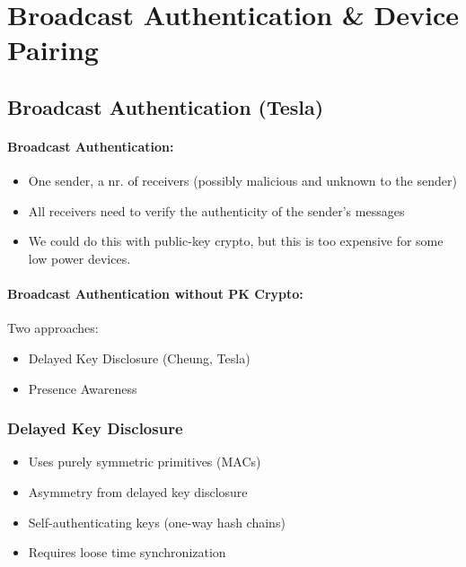 \section{Broadcast Authentication & Device Pairing}

\subsection{Broadcast Authentication (Tesla)}

\paragraph{Broadcast Authentication:} 
\begin{itemize}
    \item One sender, a nr. of receivers (possibly malicious and unknown to the sender)
    \item All receivers need to verify the authenticity of the sender's messages
    \item We could do this with public-key crypto, but this is too expensive for some low power devices. 
\end{itemize}

\paragraph{Broadcast Authentication without PK Crypto:} Two approaches:
\begin{itemize}
    \item Delayed Key Disclosure (Cheung, Tesla)
    \item Presence Awareness
\end{itemize}

\subsubsection{Delayed Key Disclosure}
\begin{itemize}
    \item Uses purely symmetric primitives (MACs)
    \item Asymmetry from delayed key disclosure
    \item Self-authenticating keys (one-way hash chains)
    \item Requires loose time synchronization
\end{itemize}

